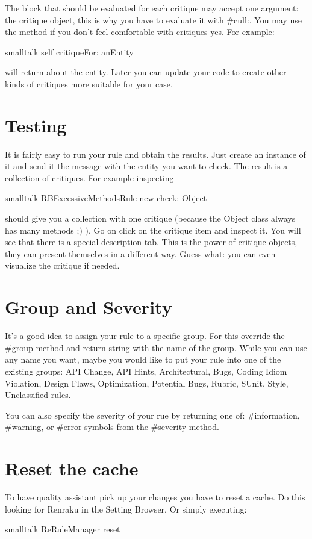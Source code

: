 \documentclass[10pt,twoside,english]{_support/latex/sbabook/sbabook}
\begin{document}
The block that should be evaluated for each critique may accept one argument: the critique object, this is why you have to evaluate it with \#cull:. You may use the  method if you don't feel comfortable with critiques yes. For example:
\begin{displaycode}{smalltalk}
    self critiqueFor: anEntity
\end{displaycode}

will return  about the entity. Later you can update your code to create other kinds of critiques more suitable for your case.

\section{Testing}
It is fairly easy to run your rule and obtain the results. Just create an instance of it and send it the  message with the entity you want to check. The result is a collection of critiques. For example inspecting
\begin{displaycode}{smalltalk}
RBExcessiveMethodsRule new check: Object
\end{displaycode}

should give you a collection with one critique (because the Object class always has many methods ;) ). Go on click on the critique item and inspect it. You will see that there is a special description tab. This is the power of critique objects, they can present themselves in a different way. Guess what: you can even visualize the critique if needed.

\section{Group and Severity}
It's a good idea to assign your rule to a specific group. For this override the \#group method and return string with the name of the group. While you can use any name you want, maybe you would like to put your rule into one of the existing groups: API Change, API Hints, Architectural, Bugs, Coding Idiom Violation, Design Flaws, Optimization, Potential Bugs, Rubric, SUnit, Style, Unclassified rules.

You can also specify the severity of your rue by returning one of: \#information, \#warning, or \#error symbols from the \#severity method.

\section{Reset the cache}
To have quality assistant pick up your changes you have to reset a cache. Do this  looking for Renraku in the Setting Browser. Or simply executing:
\begin{displaycode}{smalltalk}
ReRuleManager reset
\end{displaycode}
\end{document}
